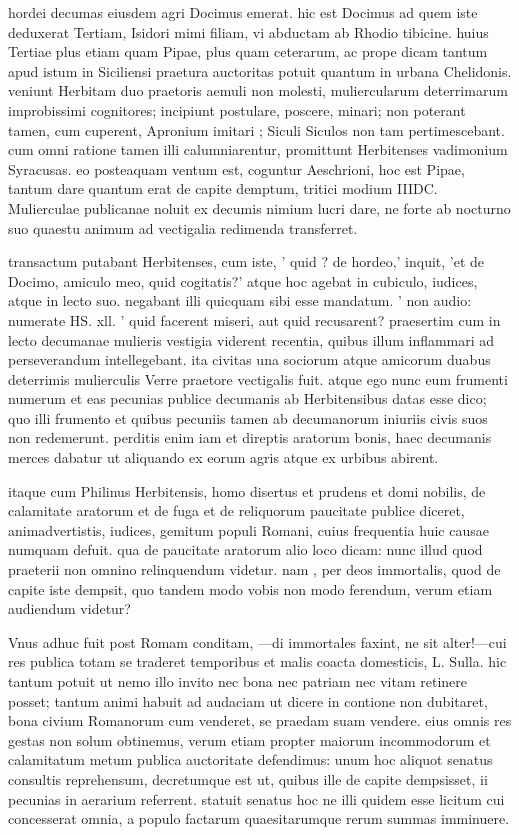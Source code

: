  hordei decumas eiusdem agri Docimus emerat. hic est Docimus ad quem iste deduxerat Tertiam, Isidori mimi filiam, vi abductam ab Rhodio tibicine. huius Tertiae plus etiam quam Pipae, plus quam ceterarum, ac prope dicam tantum apud istum in Siciliensi praetura auctoritas potuit quantum in urbana Chelidonis. veniunt Herbitam duo praetoris aemuli non molesti, muliercularum deterrimarum improbissimi cognitores; incipiunt postulare, poscere, minari; non poterant tamen, cum cuperent, Apronium imitari ; Siculi Siculos non tam pertimescebant. cum omni ratione tamen illi calumniarentur, promittunt Herbitenses vadimonium Syracusas. eo posteaquam ventum est, coguntur Aeschrioni, hoc est Pipae, tantum dare quantum erat de capite demptum, tritici modium IIIDC. Mulierculae publicanae noluit ex decumis nimium lucri dare, ne forte ab nocturno suo quaestu animum ad vectigalia redimenda transferret.

 transactum putabant Herbitenses, cum iste, ' quid ? de hordeo,' inquit, 'et de Docimo, amiculo meo, quid cogitatis?' atque hoc agebat in cubiculo, iudices, atque in lecto suo. negabant illi quicquam sibi esse mandatum. ' non audio: numerate HS. xll. ' quid facerent miseri, aut quid recusarent? praesertim cum in lecto decumanae mulieris vestigia viderent recentia, quibus illum inflammari ad perseverandum intellegebant. ita civitas una sociorum atque amicorum duabus deterrimis mulierculis Verre praetore vectigalis fuit. atque ego nunc eum frumenti numerum et eas pecunias publice decumanis ab Herbitensibus datas esse dico; quo illi frumento et quibus pecuniis tamen ab decumanorum iniuriis civis suos non redemerunt. perditis enim iam et direptis aratorum bonis, haec decumanis merces dabatur ut aliquando ex eorum agris atque ex urbibus abirent.

 itaque cum Philinus Herbitensis, homo disertus et prudens et domi nobilis, de calamitate aratorum et de fuga et de reliquorum paucitate publice diceret, animadvertistis, iudices, gemitum populi Romani, cuius frequentia huic causae numquam defuit. qua de paucitate aratorum alio loco dicam: nunc illud quod praeterii non omnino relinquendum videtur. nam , per deos immortalis, quod de capite iste dempsit, quo tandem modo vobis non modo ferendum, verum etiam audiendum videtur?

 Vnus adhuc fuit post Romam conditam, —di immortales faxint, ne sit alter!—cui res publica totam se traderet temporibus et malis coacta domesticis, L. Sulla. hic tantum potuit ut nemo illo invito nec bona nec patriam nec vitam retinere posset; tantum animi habuit ad audaciam ut dicere in contione non dubitaret, bona civium Romanorum cum venderet, se praedam suam vendere. eius omnis res gestas non solum obtinemus, verum etiam propter maiorum incommodorum et calamitatum metum publica auctoritate defendimus: unum hoc aliquot senatus consultis reprehensum, decretumque est ut, quibus ille de capite dempsisset, ii pecunias in aerarium referrent. statuit senatus hoc ne illi quidem esse licitum cui concesserat omnia, a populo factarum quaesitarumque rerum summas imminuere.


